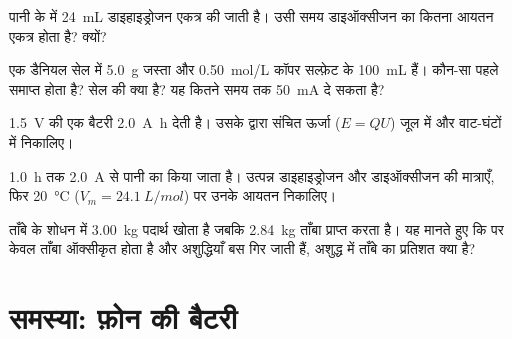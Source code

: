 \begin{exercise}[$\star\star$]\label{exo:g12:cells-and-electrolysis:11}
पानी के  में \qty{24}{mL} डाइहाइड्रोजन एकत्र की जाती है।
उसी समय डाइऑक्सीजन का कितना आयतन एकत्र होता है? क्यों?
\end{exercise}

\begin{exercise}[$\star\star\star$]\label{exo:g12:cells-and-electrolysis:12}
एक डैनियल सेल में \qty{5.0}{g} जस्ता और \qty{0.50}{mol/L} कॉपर
सल्फ़ेट के \qty{100}{mL} हैं। कौन-सा  पहले समाप्त होता है? सेल की
 क्या है? यह कितने समय तक \qty{50}{mA} दे सकता है?
\end{exercise}

\begin{exercise}[$\star\star\star$]\label{exo:g12:cells-and-electrolysis:13}
\qty{1.5}{V} की एक बैटरी \qty{2.0}{A.h} देती है। उसके द्वारा संचित
ऊर्जा ($E = Q U$) जूल में और वाट-घंटों में निकालिए।
\end{exercise}

\begin{exercise}[$\star\star\star$]\label{exo:g12:cells-and-electrolysis:14}
\qty{1.0}{h} तक \qty{2.0}{A} से पानी का  किया जाता है। उत्पन्न
डाइहाइड्रोजन और डाइऑक्सीजन की मात्राएँ, फिर \qty{20}{\celsius} ($V_m = \qty{24.1}{L/mol}$) पर
उनके आयतन निकालिए।
\end{exercise}

\begin{exercise}[$\star\star\star$]\label{exo:g12:cells-and-electrolysis:15}
ताँबे के शोधन में  \qty{3.00}{kg} पदार्थ खोता है जबकि
 \qty{2.84}{kg} ताँबा प्राप्त करता है। यह मानते हुए कि  पर केवल ताँबा
ऑक्सीकृत होता है और अशुद्धियाँ बस गिर जाती हैं, अशुद्ध  में ताँबे का
प्रतिशत क्या है?
\end{exercise}

\section{समस्या: फ़ोन की बैटरी}

